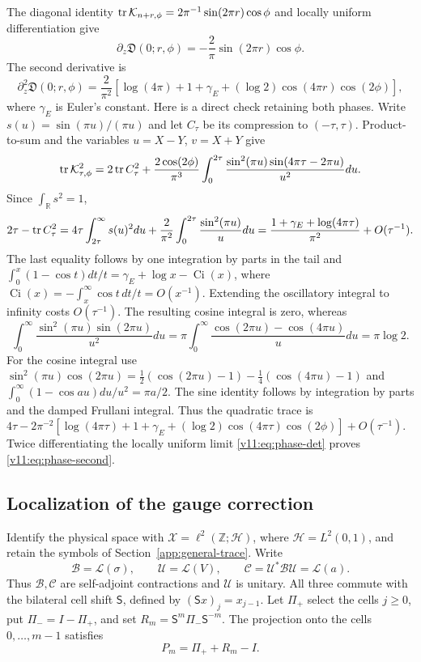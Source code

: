 The diagonal identity
$\operatorname{tr}\mathcal K_{n+r,\phi}=2\pi^{-1}\sin(2\pi r)\cos\phi$
and locally uniform differentiation give
\begin{equation}\label{v11:eq:phase-first}
 \partial_z\mathfrak D(0;r,\phi)
 =-\frac2\pi\sin(2\pi r)\cos\phi.
\end{equation}
The second derivative is
\begin{equation}\label{v11:eq:phase-second}
 \partial_z^2\mathfrak D(0;r,\phi)=\frac2{\pi^2}
 [\log(4\pi)+1+\gamma_E+(\log2)\cos(4\pi r)\cos(2\phi)],
\end{equation}
where $\gamma_E$ is Euler's constant. Here is a direct check retaining
both phases. Write $s(u)=\sin(\pi u)/(\pi u)$ and let $C_\tau$ be
its compression to $(-\tau,\tau)$. Product-to-sum and the variables
$u=X-Y$, $v=X+Y$ give
\[
 \operatorname{tr}\mathcal K_{\tau,\phi}^2
 =2\operatorname{tr} C_\tau^2+\frac{2\cos(2\phi)}{\pi^3}
   \int_0^{2\tau}\frac{\sin^2(\pi u)\sin(4\pi\tau-2\pi u)}{u^2}du.
\]
Since $\int_\mathbb R s^2=1$,
\[
 2\tau-\operatorname{tr} C_\tau^2
 =4\tau\int_{2\tau}^\infty s(u)^2du+
       \frac2{\pi^2}\int_0^{2\tau}\frac{\sin^2(\pi u)}u du
 =\frac{1+\gamma_E+\log(4\pi\tau)}{\pi^2}+O(\tau^{-1}).
\]
The last equality follows by one integration by parts in the tail and
$\int_0^x(1-\cos t)dt/t=\gamma_E+\log x-\operatorname{Ci}(x)$,
where $\operatorname{Ci}(x)=-\int_x^\infty\cos t\,dt/t=O(x^{-1})$.
Extending the oscillatory integral to infinity costs $O(\tau^{-1})$.
The resulting cosine integral is zero, whereas
\[
 \int_0^\infty\frac{\sin^2(\pi u)\sin(2\pi u)}{u^2}du
 =\pi\int_0^\infty\frac{\cos(2\pi u)-\cos(4\pi u)}u du
 =\pi\log2.
\]
For the cosine integral use
$\sin^2(\pi u)\cos(2\pi u)=\tfrac12(\cos(2\pi u)-1)
-\tfrac14(\cos(4\pi u)-1)$ and
$\int_0^\infty(1-\cos au)du/u^2=\pi a/2$.
The sine identity follows by integration by parts and the damped
Frullani integral. Thus the quadratic trace is
$4\tau-2\pi^{-2}[\log(4\pi\tau)+1+\gamma_E+
(\log2)\cos(4\pi\tau)\cos(2\phi)]+O(\tau^{-1})$.
Twice differentiating the locally uniform limit
\eqref{v11:eq:phase-det} proves \eqref{v11:eq:phase-second}.

\subsection{Localization of the gauge correction}

Identify the physical space with
$\mathscr X=\ell^2(\mathbb Z;\mathscr H)$, where $\mathscr H=L^2(0,1)$,
and retain the symbols of Section~\ref{app:general-trace}.  Write
\[
 \mathscr B=\mathcal L(\sigma),\qquad
 \mathscr U=\mathcal L(V),\qquad
 \mathscr C=\mathscr U^*\mathscr B\mathscr U=\mathcal L(a).
\]
Thus $\mathscr B,\mathscr C$ are self-adjoint contractions and
$\mathscr U$ is unitary.  All three commute with the bilateral cell shift
$\mathsf S$, defined by $(\mathsf Sx)_j=x_{j-1}$.
Let $\Pi_+$ select the cells $j\ge0$, put $\Pi_-=I-\Pi_+$, and set
$R_m=\mathsf S^m\Pi_-\mathsf S^{-m}$.  The projection onto the cells
$0,\ldots,m-1$ satisfies
\begin{equation}\label{v11:eq:projection-split}
 P_m=\Pi_++R_m-I.
\end{equation}

